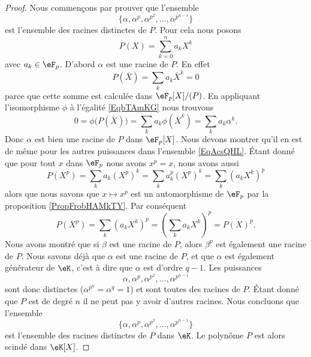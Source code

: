 \begin{proof}
    Nous commençons par prouver que l'ensemble
    \begin{equation}        \label{EqAcsQHL}
        \{ \alpha,\alpha^p,\alpha^{p^2},\ldots, \alpha^{p^{n-1}} \}
    \end{equation}
    est l'ensemble des racines distinctes de \( P\). Pour cela nous posons
    \begin{equation}
        P(X)=\sum_{k=0}^na_kX^k
    \end{equation}
    avec \( a_k\in\eF_p\). D'abord \( \alpha\) est une racine de \( P\). En effet
    \begin{equation}        \label{EqbTAmKG}
        P(\bar X)=\sum_ka_k\bar X^k=0
    \end{equation}
    parce que cette somme est calculée dans \( \eF_p[X]/(P)\). En appliquant l'isomorphisme \( \phi\) à l'égalité \eqref{EqbTAmKG} nous trouvons
    \begin{equation}
        0=\phi\big( P(\bar X) \big)=\sum_ka_k\phi(\bar X^k)=\sum_ka_k\alpha^k.
    \end{equation}
    Donc \( \alpha\) est bien une racine de \( P\) dans \( \eF_p[X]\). Nous devons montrer qu'il en est de même pour les autres puissances dans l'ensemble \eqref{EqAcsQHL}. Étant donné que pour tout \( x\) dans \( \eF_p\) nous avons \( x^p=x\), nous avons aussi
    \begin{equation}
        P(X^p)=\sum_ka_k(X^p)^k=\sum_ka_k^p(X^p)^k=\sum_k(a_kX^k)^p
    \end{equation}
    alors que nous savons que \( x\mapsto x^p\) est un automorphisme de \( \eF_p\) par la proposition \ref{PropFrobHAMkTY}. Par conséquent
    \begin{equation}
        P(X^p)=\sum_k(a_kX^k)^p=\left( \sum_k a_kX^k\right)^p=P(X)^p.
    \end{equation}
    Nous avons montré que si \( \beta\) est une racine de \( P\), alors \( \beta^p\) est également une racine de \( P\). Nous savons déjà que \( \alpha\) est une racine de \( P\), et que \( \alpha\) est également générateur de \( \eK\), c'est à dire que \( \alpha\) est d'ordre \( q-1\). Les puissances
    \begin{equation}
        \alpha,\alpha^p,\alpha^{p^2},\ldots, \alpha^{p^{n-1}}
    \end{equation}
    sont donc distinctes (\( \alpha^{p^n}=\alpha^q=1\)) et sont toutes des racines de \( P\). Étant donné que \( P\) est de degré \( n\) il ne peut pas y avoir d'autres racines. Nous concluons que l'ensemble
    \begin{equation}
        \{ \alpha,\alpha^p,\alpha^{p^2},\ldots, \alpha^{p^{n-1}}\}
    \end{equation}
    est l'ensemble des racines distinctes de \( P\) dans \( \eK\). Le polynôme \( P\) est alors scindé dans \( \eK[X]\).


\end{proof}
